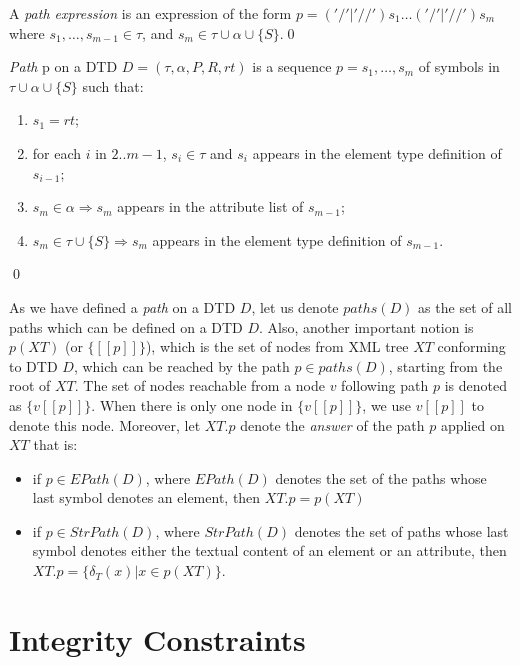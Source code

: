 \begin{define}
A {\sl path expression} is an expression of the form $p = ('/' | '//')s_1 \dots ('/'|'//')s_m$ where $s_1, \dots, s_{m-1} \in \tau$, and $s_m \in \tau \cup \alpha \cup \{S\}$.\qed
\end{define}

\begin{define}[Path]
{\sl Path} p on a DTD $D = (\tau, \alpha, P, R, rt)$ is a sequence $p = s_1, \dots, s_m$ of symbols in $\tau \cup \alpha \cup \{S\}$ such that:
\renewcommand{\labelenumi}{\roman{enumi})}
	\begin{enumerate}
		\item $s_1=rt$;
		\item for each $i$ in $2..m-1$, $s_i \in \tau$ and $s_i$ appears in the element type definition of $s_{i-1}$;
		\item $s_m \in \alpha \Rightarrow s_m$ appears in the attribute list of $s_{m-1}$;
		\item $s_m \in \tau \cup \{S\} \Rightarrow s_m$ appears in the element type definition of $s_{m-1}$.
	\end{enumerate}\qed
\end{define}

As we have defined a \emph{path} on a DTD $D$, let us denote $paths(D)$ as the set of all paths which can be defined on a DTD $D$. Also, another important notion is $p(XT)$ (or $\{[\![p]\!]\}$), which is the set of nodes from XML tree $XT$ conforming to DTD $D$, which can be reached by the path $p \in paths(D)$, starting from the root of $XT$. The set of nodes reachable from a node $v$ following path $p$ is denoted as $\{v[\![p]\!]\}$. When there is only one node in $\{v[\![p]\!]\}$, we use $v[\![p]\!]$ to denote this node. Moreover, let $XT.p$ denote the \emph{answer} of the path $p$ applied on $XT$ that is:
\begin{itemize}
	\item if $p \in EPath(D)$, where $EPath(D)$ denotes the set of the paths whose last symbol denotes an element, then $XT.p = p(XT)$
	\item if $p \in StrPath(D)$, where $StrPath(D)$ denotes the set of paths whose last symbol denotes either the textual content of an element or an
attribute, then $XT.p = \{\delta_T(x)|x \in p(XT)\}$.
\end{itemize}

\section{Integrity Constraints}

